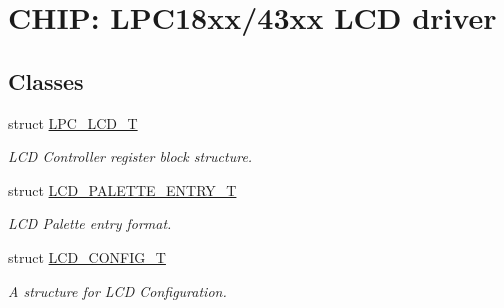\hypertarget{group___l_c_d__18_x_x__43_x_x}{}\section{C\+H\+IP\+: L\+P\+C18xx/43xx L\+CD driver}
\label{group___l_c_d__18_x_x__43_x_x}
\subsection*{Classes}
\begin{DoxyCompactItemize}
\item 
struct \hyperlink{struct_l_p_c___l_c_d___t}{L\+P\+C\+\_\+\+L\+C\+D\+\_\+T}
\begin{DoxyCompactList}\small\item\em L\+CD Controller register block structure. \end{DoxyCompactList}\item 
struct \hyperlink{struct_l_c_d___p_a_l_e_t_t_e___e_n_t_r_y___t}{L\+C\+D\+\_\+\+P\+A\+L\+E\+T\+T\+E\+\_\+\+E\+N\+T\+R\+Y\+\_\+T}
\begin{DoxyCompactList}\small\item\em L\+CD Palette entry format. \end{DoxyCompactList}\item 
struct \hyperlink{struct_l_c_d___c_o_n_f_i_g___t}{L\+C\+D\+\_\+\+C\+O\+N\+F\+I\+G\+\_\+T}
\begin{DoxyCompactList}\small\item\em A structure for L\+CD Configuration. \end{DoxyCompactList}\end{DoxyCompactItemize}
